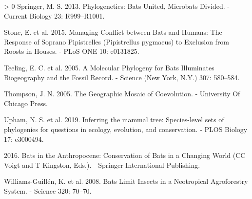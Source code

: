 \documentclass[11pt]{article}
\newlength{\cslhangindent}
\newenvironment{CSLReferences}[3] %
 {%
  \setlength{\parindent}{0pt}
  \ifodd #1 \everypar{\setlength{\hangindent}{\cslhangindent}}\ignorespaces\fi
  \ifnum #2 > 0
  \setlength{\parskip}{#2\baselineskip}
  \fi
 }%
 {}
\begin{document}
\begin{CSLReferences}{1}{0}
\leavevmode\hypertarget{ref-Springer2013PhyBat}{}%
Springer, M. S. 2013. Phylogenetics: Bats United, Microbats Divided. -
Current Biology 23: R999--R1001.

\leavevmode\hypertarget{ref-Stone2015ManCon}{}%
Stone, E. et al. 2015. Managing Conflict between Bats and Humans: The
Response of Soprano Pipistrelles (Pipistrellus pygmaeus) to Exclusion
from Roosts in Houses. - PLoS ONE 10: e0131825.

\leavevmode\hypertarget{ref-Teeling2005MolPhy}{}%
Teeling, E. C. et al. 2005. A Molecular Phylogeny for Bats Illuminates
Biogeography and the Fossil Record. - Science (New York, N.Y.) 307:
580--584.

\leavevmode\hypertarget{ref-Thompson2005GeoMos}{}%
Thompson, J. N. 2005. The Geographic Mosaic of Coevolution. - University
Of Chicago Press.

\leavevmode\hypertarget{ref-Upham2019InfMam}{}%
Upham, N. S. et al. 2019. Inferring the mammal tree: Species-level sets
of phylogenies for questions in ecology, evolution, and conservation. -
PLOS Biology 17: e3000494.

\leavevmode\hypertarget{ref-Voigt2016BatAnt}{}%
2016. Bats in the Anthropocene: Conservation of Bats in a Changing World
(CC Voigt and T Kingston, Eds.). - Springer International Publishing.

\leavevmode\hypertarget{ref-Williams-Guillen2008BatLim}{}%
Williams-Guillén, K. et al. 2008. Bats Limit Insects in a Neotropical
Agroforestry System. - Science 320: 70--70.

\end{CSLReferences}
\end{document}
